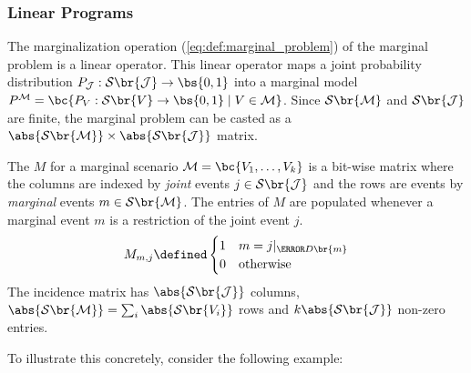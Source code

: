\documentclass[aps, 10pt, english, twoside, pra, nofootinbib, tightenlines, longbibliography]{revtex4-1}
\renewcommand{\Events}[1]{\mathcal{S}\br{#1}} %
\begin{document}
    \subsubsection{Linear Programs}
    \label{sec:linear_programs}
    The marginalization operation (\cref{eq:def:marginal_problem}) of the marginal problem is a linear operator. This linear operator maps a joint probability distribution $\prob[\jointvar] : \Events{\jointvar} \to \bs{0,1}$ into a marginal model $\prob^{\mscenario} = \bc{\prob[V] : \Events{V} \to \bs{0,1} \mid V \in \mscenario}$. Since $\Events{\mscenario}$ and $\Events{\jointvar}$ are finite, the marginal problem can be casted as a $\abs{\Events{\mscenario}} \times \abs{\Events{\jointvar}}$ matrix.

    \begin{definition}
        \label{def:incidence_matrix}
        The  $M$ for a marginal scenario $\mscenario = \bc{V_1, \dots, V_k}$ is a bit-wise matrix where the columns are indexed by \textit{joint} events $j \in \Events{\jointvar}$ and the rows are events by \textit{marginal} events $m \in \Events{\mscenario}$. The entries of $M$ are populated whenever a marginal event $m$ is a restriction of the joint event $j$.
        \[ M_{m,j} \defined \begin{cases}
            1 & m = j|_{\s{D}\br{m}} \\
            0 & \text{otherwise}
        \end{cases} \]
        The incidence matrix has $\abs{\Events{\jointvar}}$ columns, $\abs{\Events{\mscenario}} = \sum_{i} \abs{\Events{V_i}}$ rows and $k\abs{\Events{\jointvar}}$ non-zero entries.
    \end{definition}
    To illustrate this concretely, consider the following example:
\end{document}
